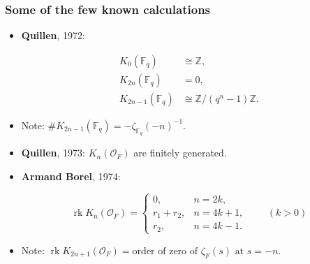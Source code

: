 \documentclass[handout]{beamer}
\newcommand{\personality}[1]{{\bf #1}}
\newcommand{\ZZ}{\mathbb{Z}}
\newcommand{\FF}{\mathbb{F}}
\newcommand{\isom}{\cong}
\renewcommand{\O}{\mathcal{O}}
\DeclareMathOperator{\rk}{rk}
\begin{document}

\begin{frame}
  \frametitle{Some of the few known calculations}

  \begin{itemize}
  \item<2-> \personality{Quillen}, 1972:

    \begin{align*}
      K_0 (\FF_q) & \isom \ZZ,\\
      K_{2n} (\FF_q) & = 0,\\
      K_{2n-1} (\FF_q) & \isom \ZZ/(q^n - 1)\ZZ.
    \end{align*}

  \item<3-> Note: $\# K_{2n-1} (\FF_q) = -\zeta_{\FF_q} (-n)^{-1}$.

  \item<4-> \personality{Quillen}, 1973: $K_n (\O_F)$ are finitely generated.

  \item<5-> \personality{Armand Borel}, 1974:

    $$\rk K_n (\O_F) = \begin{cases}
      0, & n = 2k,\\
      r_1+r_2, & n = 4k + 1,\\
      r_2, & n = 4k -1.
    \end{cases} \quad\quad (k > 0)$$

  \item<6-> Note: $\rk K_{2n+1} (\O_F) = \text{order of zero of }\zeta_F (s)\text{ at }s=-n.$
  \end{itemize}
\end{frame}

\end{document}
